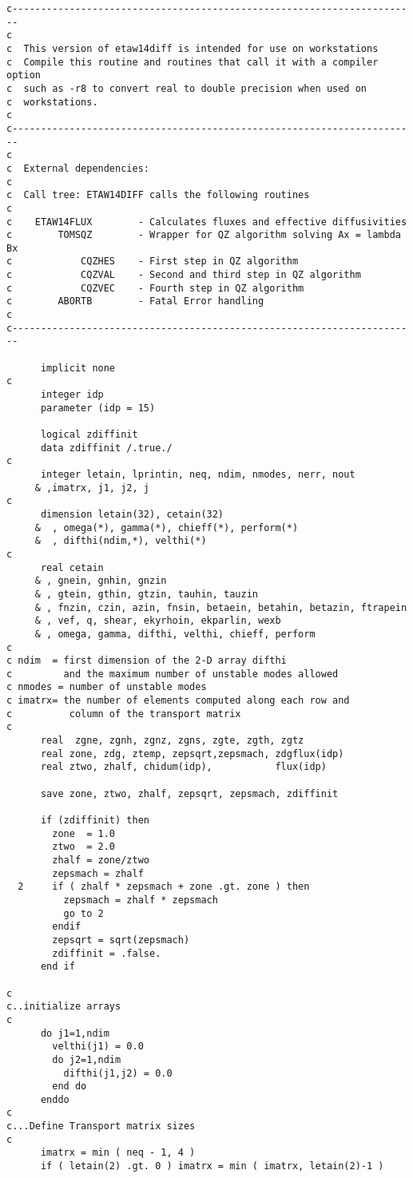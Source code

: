 \begin{verbatim}
c-----------------------------------------------------------------------
c
c  This version of etaw14diff is intended for use on workstations
c  Compile this routine and routines that call it with a compiler option 
c  such as -r8 to convert real to double precision when used on 
c  workstations.
c
c-----------------------------------------------------------------------
c
c  External dependencies:
c
c  Call tree: ETAW14DIFF calls the following routines
c
c    ETAW14FLUX        - Calculates fluxes and effective diffusivities
c        TOMSQZ        - Wrapper for QZ algorithm solving Ax = lambda Bx
c            CQZHES    - First step in QZ algorithm 
c            CQZVAL    - Second and third step in QZ algorithm
c            CQZVEC    - Fourth step in QZ algorithm
c        ABORTB        - Fatal Error handling
c
c-----------------------------------------------------------------------

      implicit none
c
      integer idp
      parameter (idp = 15)

      logical zdiffinit
      data zdiffinit /.true./
c
      integer letain, lprintin, neq, ndim, nmodes, nerr, nout
     & ,imatrx, j1, j2, j
c
      dimension letain(32), cetain(32)
     &  , omega(*), gamma(*), chieff(*), perform(*)
     &  , difthi(ndim,*), velthi(*)
c
      real cetain
     & , gnein, gnhin, gnzin
     & , gtein, gthin, gtzin, tauhin, tauzin
     & , fnzin, czin, azin, fnsin, betaein, betahin, betazin, ftrapein
     & , vef, q, shear, ekyrhoin, ekparlin, wexb
     & , omega, gamma, difthi, velthi, chieff, perform
c
c ndim  = first dimension of the 2-D array difthi
c         and the maximum number of unstable modes allowed
c nmodes = number of unstable modes
c imatrx= the number of elements computed along each row and
c          column of the transport matrix
c
      real  zgne, zgnh, zgnz, zgns, zgte, zgth, zgtz
      real zone, zdg, ztemp, zepsqrt,zepsmach, zdgflux(idp)
      real ztwo, zhalf, chidum(idp),           flux(idp)

      save zone, ztwo, zhalf, zepsqrt, zepsmach, zdiffinit

      if (zdiffinit) then 
        zone  = 1.0
        ztwo  = 2.0
        zhalf = zone/ztwo
        zepsmach = zhalf
  2     if ( zhalf * zepsmach + zone .gt. zone ) then
          zepsmach = zhalf * zepsmach
          go to 2
        endif
        zepsqrt = sqrt(zepsmach)
        zdiffinit = .false.
      end if

c
c..initialize arrays 
c
      do j1=1,ndim
        velthi(j1) = 0.0
        do j2=1,ndim
          difthi(j1,j2) = 0.0
        end do
      enddo
c
c...Define Transport matrix sizes
c
      imatrx = min ( neq - 1, 4 )
      if ( letain(2) .gt. 0 ) imatrx = min ( imatrx, letain(2)-1 )


\end{verbatim}
